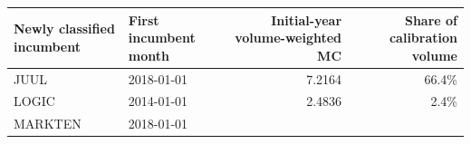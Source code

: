 \documentclass[10pt,]{article}
\begin{document}
\begin{longtable}[]{@{}llrr@{}}
\toprule
\begin{minipage}[b]{0.22\columnwidth}\raggedright\strut
Newly classified incumbent\strut
\end{minipage} & \begin{minipage}[b]{0.18\columnwidth}\raggedright\strut
First incumbent month\strut
\end{minipage} & \begin{minipage}[b]{0.26\columnwidth}\raggedleft\strut
Initial-year volume-weighted MC\strut
\end{minipage} & \begin{minipage}[b]{0.23\columnwidth}\raggedleft\strut
Share of calibration volume\strut
\end{minipage}\tabularnewline
\midrule
\endhead
\begin{minipage}[t]{0.22\columnwidth}\raggedright\strut
JUUL\strut
\end{minipage} & \begin{minipage}[t]{0.18\columnwidth}\raggedright\strut
2018-01-01\strut
\end{minipage} & \begin{minipage}[t]{0.26\columnwidth}\raggedleft\strut
7.2164\strut
\end{minipage} & \begin{minipage}[t]{0.23\columnwidth}\raggedleft\strut
66.4\%\strut
\end{minipage}\tabularnewline
\begin{minipage}[t]{0.22\columnwidth}\raggedright\strut
LOGIC\strut
\end{minipage} & \begin{minipage}[t]{0.18\columnwidth}\raggedright\strut
2014-01-01\strut
\end{minipage} & \begin{minipage}[t]{0.26\columnwidth}\raggedleft\strut
2.4836\strut
\end{minipage} & \begin{minipage}[t]{0.23\columnwidth}\raggedleft\strut
2.4\%\strut
\end{minipage}\tabularnewline
\begin{minipage}[t]{0.22\columnwidth}\raggedright\strut
MARKTEN\strut
\end{minipage} & \begin{minipage}[t]{0.18\columnwidth}\raggedright\strut
2018-01-01\strut
\end{minipage} & \begin{minipage}[t]{0.26\columnwidth}\raggedleft\strut

\end{minipage}
\end{longtable}
\end{document}

